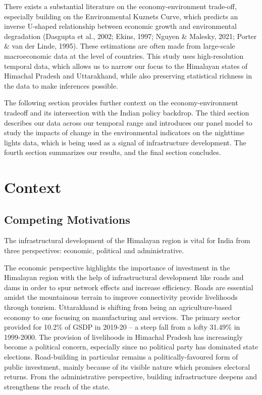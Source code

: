 \documentclass{article}
\begin{document}
There exists a substantial literature on the economy-environment trade-off, especially building on the Environmental Kuznets Curve, which predicts an inverse U-shaped relationship between economic growth and environmental degradation (Dasgupta et al., 2002; Ekins, 1997; Nguyen \& Malesky, 2021; Porter \& van der Linde, 1995). These estimations are often made from large-scale macroeconomic data at the level of countries. This study uses high-resolution temporal data, which allows us to narrow our focus to the Himalayan states of Himachal Pradesh and Uttarakhand, while also preserving statistical richness in the data to make inferences possible. 

The following section provides further context on the economy-environment tradeoff and its intersection with the Indian policy backdrop. The third section describes our data across our temporal range and introduces our panel model to study the impacts of change in the environmental indicators on the nighttime lights data, which is being used as a signal of infrastructure development. The fourth section summarizes our results, and the final section concludes.


\section{Context}

\subsection{Competing Motivations}

The infrastructural development of the Himalayan region is vital for India from three perspectives: economic, political and administrative. 

The economic perspective highlights the importance of investment in the Himalayan region with the help of infrastructural development like roads and dams in order to spur network effects and increase efficiency. Roads are essential amidst the mountainous terrain to improve connectivity provide livelihoods through tourism. Uttarakhand is shifting from being an agriculture-based economy to one focusing on manufacturing and services. The primary sector provided for 10.2\% of GSDP in 2019-20 – a steep fall from a lofty 31.49\% in 1999-2000. The provision of livelihoods in Himachal Pradesh has increasingly become a political concern, especially since no political party has dominated state elections. Road-building in particular remains a politically-favoured form of public investment, mainly because of its visible nature which promises electoral returns. From the administrative perspective, building infrastructure deepens and strengthens the reach of the state. 
\end{document}
